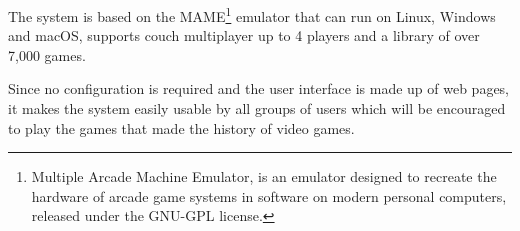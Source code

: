 The system is based on the MAME\footnote{Multiple Arcade Machine Emulator, is an emulator designed to recreate the hardware of arcade game systems in software on modern personal computers, released under the GNU-GPL license.} emulator that can run on Linux, Windows and macOS, supports couch multiplayer up to 4 players and a library of over 7,000 games.

Since no configuration is required and the user interface is made up of web pages, it makes the system easily usable by all groups of users which will be encouraged to play the games that made the history of video games.